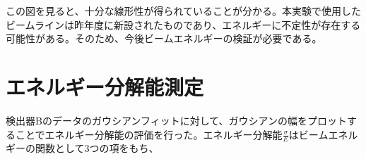 この図を見ると、十分な線形性が得られていることが分かる。本実験で使用したビームラインは昨年度に新設されたものであり、エネルギーに不定性が存在する可能性がある。そのため、今後ビームエネルギーの検証が必要である。


\section{エネルギー分解能測定}
検出器Bのデータのガウシアンフィットに対して、ガウシアンの幅をプロットすることでエネルギー分解能の評価を行った。エネルギー分解能$\frac{\sigma}{E}$はビームエネルギーの関数として3つの項をもち、
